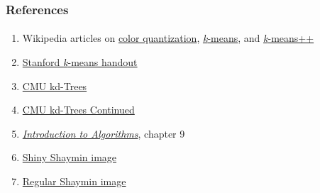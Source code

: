 \documentclass{beamer}                             %
\begin{document}
\begin{frame}
\frametitle{References}
\framesubtitle{}
\begin{enumerate}
  \item Wikipedia articles on 
    \href{https://en.wikipedia.org/wiki/Color_quantization}{color quantization},
    \href{https://en.wikipedia.org/wiki/K-means_clustering}{\textit{k}-means},
    and \href{https://en.wikipedia.org/wiki/K-means\%2B\%2B}{\textit{k}-means++}
  \item \href{https://stanford.edu/~cpiech/cs221/handouts/kmeans.html}
    {Stanford \textit{k}-means handout}
  \item \href{https://www.cs.cmu.edu/~ckingsf/bioinfo-lectures/kdtrees.pdf}
    {CMU kd-Trees}
  \item \href{https://www.cs.cmu.edu/~ckingsf/bioinfo-lectures/kdrangenn.pdf}
    {CMU kd-Trees Continued}
  \item \href{https://mitpress.mit.edu/books/introduction-algorithms-third-edition}
    {\textit{Introduction to Algorithms}}, chapter 9
  \item \href{https://www.deviantart.com/ilikki/art/Shiny-Shaymin-Sky-498672972}
{Shiny Shaymin image}
  \item \href{https://pokemondb.net/artwork/shaymin}{Regular Shaymin image}
\end{enumerate}
\end{frame}

\end{document}
